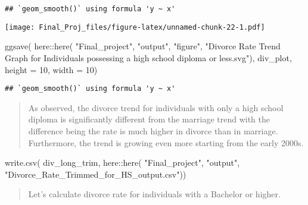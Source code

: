 \documentclass[
]{article}
\newenvironment{Shaded}{\begin{snugshade}}{\end{snugshade}}
\newcommand{\AttributeTok}[1]{\textcolor[rgb]{0.77,0.63,0.00}{#1}}
\newcommand{\DecValTok}[1]{\textcolor[rgb]{0.00,0.00,0.81}{#1}}
\newcommand{\FunctionTok}[1]{\textcolor[rgb]{0.00,0.00,0.00}{#1}}
\newcommand{\NormalTok}[1]{#1}
\newcommand{\SpecialCharTok}[1]{\textcolor[rgb]{0.00,0.00,0.00}{#1}}
\newcommand{\StringTok}[1]{\textcolor[rgb]{0.31,0.60,0.02}{#1}}
\begin{document}
\begin{verbatim}
## `geom_smooth()` using formula 'y ~ x'
\end{verbatim}

\texttt{[image: Final\_Proj\_files/figure-latex/unnamed-chunk-22-1.pdf]}

\begin{Shaded}
\begin{Highlighting}[]
\FunctionTok{ggsave}\NormalTok{(}
\NormalTok{  here}\SpecialCharTok{::}\FunctionTok{here}\NormalTok{(}
    \StringTok{"Final\_project"}\NormalTok{, }
    \StringTok{"output"}\NormalTok{, }
    \StringTok{"figure"}\NormalTok{,}
    \StringTok{"Divorce Rate Trend Graph for Individuals possessing a high school diploma or less.svg"}\NormalTok{),}
\NormalTok{       div\_plot,}
       \AttributeTok{height =} \DecValTok{10}\NormalTok{,}
       \AttributeTok{width =} \DecValTok{10}\NormalTok{)}
\end{Highlighting}
\end{Shaded}

\begin{verbatim}
## `geom_smooth()` using formula 'y ~ x'
\end{verbatim}

\begin{quote}
As observed, the divorce trend for individuals with only a high school
diploma is significantly different from the marriage trend with the
difference being the rate is much higher in divorce than in marriage.
Furthermore, the trend is growing even more starting from the early
2000s.
\end{quote}

\begin{Shaded}
\begin{Highlighting}[]
\FunctionTok{write.csv}\NormalTok{(}
\NormalTok{  div\_long\_trim,}
\NormalTok{          here}\SpecialCharTok{::}\FunctionTok{here}\NormalTok{(}
            \StringTok{"Final\_project"}\NormalTok{,}
            \StringTok{"output"}\NormalTok{,}
            \StringTok{"Divorce\_Rate\_Trimmed\_for\_HS\_output.csv"}\NormalTok{))}
\end{Highlighting}
\end{Shaded}

\begin{quote}
Let's calculate divorce rate for individuals with a Bachelor or higher.
\end{quote}
\end{document}

